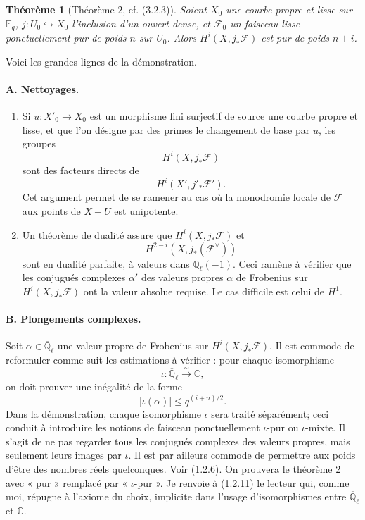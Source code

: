 \documentclass[11pt]{article}
\newtheorem{theorem}{Théorème}
\theoremstyle{remark}
\newcommand{\Ql}{\mathbb{Q}_\ell}
\newcommand{\CC}{\mathbb{C}}
\newcommand{\Fq}{\mathbb{F}_q}
\newcommand{\Abar}{\overline{\mathbb{Q}}_\ell}
\begin{document}
\begin{theorem}[Théorème 2, cf. (3.2.3)]
Soient $X_0$ une courbe propre et lisse sur $\Fq$, $j:U_0\hookrightarrow X_0$ l'inclusion d'un ouvert dense, et $\mathcal F_0$ un faisceau lisse ponctuellement pur de poids $n$ sur $U_0$. Alors $H^i(X,j_*\mathcal F)$ est pur de poids $n+i$.
\end{theorem}

Voici les grandes lignes de la démonstration.

\paragraph{A. Nettoyages.}
\begin{enumerate}[label=(\roman*)]
\item Si $u:X'_0\to X_0$ est un morphisme fini surjectif de source une courbe propre et lisse, et que l'on désigne par des primes le changement de base par $u$, les groupes
\[
H^i(X,j_*\mathcal F)
\]
sont des facteurs directs de
\[
H^i(X',j'_*\mathcal F').
\]
Cet argument permet de se ramener au cas où la monodromie locale de $\mathcal F$ aux points de $X-U$ est unipotente.
\item Un théorème de dualité assure que $H^i(X,j_*\mathcal F)$ et
\[
H^{2-i}(X,j_*(\mathcal F^\vee))
\]
sont en dualité parfaite, à valeurs dans $\Ql(-1)$. Ceci ramène à vérifier que les conjugués complexes $\alpha'$ des valeurs propres $\alpha$ de Frobenius sur $H^i(X,j_*\mathcal F)$ ont la valeur absolue requise. Le cas difficile est celui de $H^1$.
\end{enumerate}

\paragraph{B. Plongements complexes.}
Soit $\alpha\in\Abar$ une valeur propre de Frobenius sur $H^i(X,j_*\mathcal F)$. Il est commode de reformuler comme suit les estimations à vérifier : pour chaque isomorphisme
\[
\iota:\Abar\xrightarrow{\sim}\CC,
\]
on doit prouver une inégalité de la forme
\[
|\iota(\alpha)|\le q^{(i+n)/2}.
\]
Dans la démonstration, chaque isomorphisme $\iota$ sera traité séparément; ceci conduit à introduire les notions de faisceau ponctuellement $\iota$-pur ou $\iota$-mixte. Il s'agit de ne pas regarder tous les conjugués complexes des valeurs propres, mais seulement leurs images par $\iota$. Il est par ailleurs commode de permettre aux poids d'être des nombres réels quelconques. Voir (1.2.6). On prouvera le théorème 2 avec « pur » remplacé par « $\iota$-pur ». Je renvoie à (1.2.11) le lecteur qui, comme moi, répugne à l'axiome du choix, implicite dans l'usage d'isomorphismes entre $\Abar$ et $\CC$.
\end{document}
